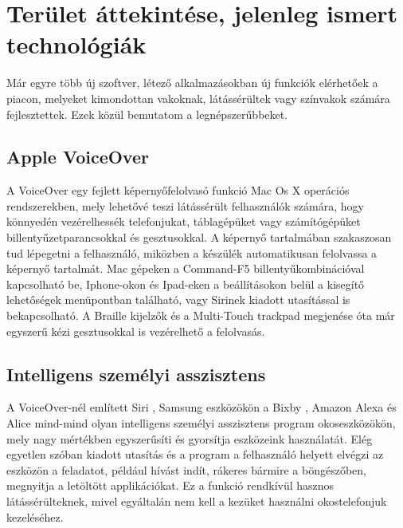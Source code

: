 \documentclass[12pt]{report}
\begin{document}
\chapter{Terület áttekintése, jelenleg ismert technológiák}
Már egyre több új szoftver, létező alkalmazásokban új funkciók elérhetőek a piacon, melyeket kimondottan vakoknak, látássérültek vagy színvakok számára fejlesztettek. Ezek közül bemutatom a legnépszerűbbeket.
\section{Apple VoiceOver}
A VoiceOver \cite{voiceover} egy fejlett képernyőfelolvasó funkció Mac Os X operációs rendszerekben, mely lehetővé teszi látássérült felhasználók számára, hogy könnyedén vezérelhessék telefonjukat, táblagépüket vagy számítógépüket billentyűzetparancsokkal \cite{keysforvoiceover} és gesztusokkal. \cite{usingvoiceover} A képernyő tartalmában szakaszosan tud lépegetni a felhasználó, miközben a készülék automatikusan felolvassa a képernyő tartalmát. Mac gépeken a Command-F5 billentyűkombinációval kapcsolható be, Iphone-okon és Ipad-eken a beállításokon belül a kisegítő lehetőségek menüpontban található, vagy Sirinek kiadott utasítással is bekapcsolható. A Braille kijelzők \cite{braille} és a Multi-Touch trackpad \cite{multitouch} megjenése óta már egyszerű kézi gesztusokkal is vezérelhető a felolvasás. \cite{usingvoiceover}

\section{Intelligens személyi asszisztens}
A VoiceOver-nél említett Siri \cite{siri}, Samsung eszközökön a Bixby \cite{bixby}, Amazon Alexa és Alice mind-mind olyan intelligens személyi asszisztens program okoseszközökön, mely nagy mértékben egyszerűsíti és gyorsítja eszközeink használatát. Elég egyetlen szóban kiadott utasítás és a program a felhasználó helyett elvégzi az eszközön a feladatot, például hívást indít, rákeres bármire a böngészőben, megnyitja a letöltött applikációkat. Ez a funkció rendkívül hasznos látássérülteknek, mivel egyáltalán nem kell a kezüket használni okostelefonjuk kezeléséhez.
\end{document}
